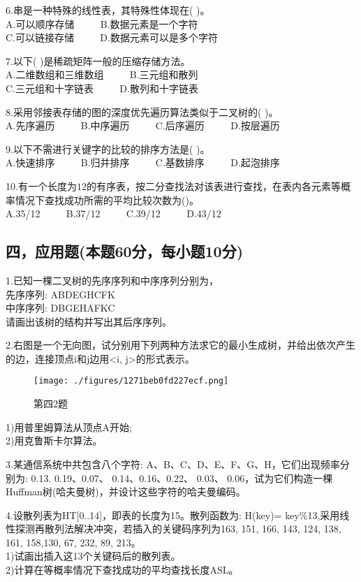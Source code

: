 6.串是一种特殊的线性表，其特殊性体现在( )。 \\
A.可以顺序存储 $\qquad$ B.数据元素是一个字符 \\
C.可以链接存储 $\qquad$ D.数据元素可以是多个字符

7.以下( )是稀疏矩阵一般的压缩存储方法。 \\
A.二维数组和三维数组 $\qquad$ B.三元组和散列 \\
C.三元组和十字链表 $\qquad$ D.散列和十字链表

8.采用邻接表存储的图的深度优先遍历算法类似于二叉树的( )。 \\
A.先序遍历 $\qquad$ B.中序遍历 $\qquad$ C.后序遍历 $\qquad$ D.按层遍历

9.以下不需进行关键字的比较的排序方法是(  )。 \\
A.快速排序 $\qquad$ B.归并排序 $\qquad$ C.基数排序 $\qquad$ D.起泡排序

10.有一个长度为$12$的有序表，按二分查找法对该表进行查找，在表内各元素等概率情况下查找成功所需的平均比较次数为()。 \\
A.35/12 $\qquad$ B.37/12 $\qquad$ C.39/12 $\qquad$ D.43/12

\subsection{四，应用题(本题60分，每小题10分)}

1.已知一棵二叉树的先序序列和中序序列分别为， \\
先序序列: ABDEGHCFK \\
中序序列: DBGEHAFKC \\
请画出该树的结构并写出其后序序列。

2.右图是一个无向图，试分别用下列两种方法求它的最小生成树，并给出依次产生的边，连接顶点i和j边用<i, j>的形式表示。
\begin{figure}[ht]
\centering
\texttt{[image: ./figures/1271beb0fd227ecf.png]}
\caption{第四2题} \label{fig_SMDS14_1}
\end{figure}
1)用普里姆算法从顶点A开始; \\
2)用克鲁斯卡尔算法。

3.某通信系统中共包含八个字符: A、B、C、D、E、F、G、H，它们出现频率分别为: 0.13. 0.19、0.07、 0.14、0.16、0.22、 0.03、 0.06，试为它们构造一棵Huffman树(哈夫曼树)，并设计这些字符的哈夫曼编码。

4.设散列表为HT[0..14]，即表的长度为15。散列函数为: H(key)= key\%13,采用线性探测再散列法解决冲突，若插入的关键码序列为{163, 151, 166, 143, 124, 138, 161, 158,130, 67, 232, 89, 213}。 \\
1)试画出插入这13个关键码后的散列表。 \\
2)计算在等概率情况下查找成功的平均查找长度ASL。

